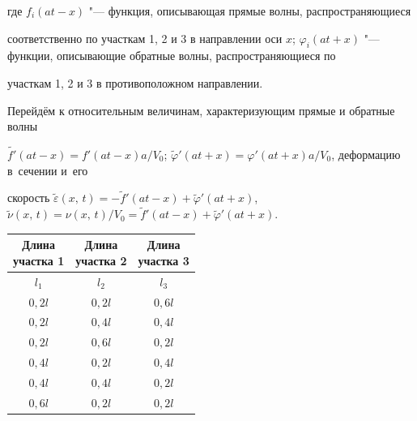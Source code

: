 где $f_i (at-x)$ "--- функция, описывающая прямые волны, распространяющиеся

соответственно по участкам 1, 2 и 3 в направлении оси $x$; $\varphi_i

(at+x)$ "--- функции, описывающие обратные волны, распространяющиеся по

участкам 1, 2 и 3 в противоположном направлении.



Перейдём к относительным величинам, характеризующим прямые и обратные волны

$\tilde {f'}(at-x)={f'(at-x)a}/{V_0}$; $\tilde {\varphi }'(at+x)={\varphi'(at+x) a}/{V_0}$, деформацию в~сечении и~его

скорость $\tilde {\varepsilon }(x,\,t)=-\tilde {f}'(at-x)+

\tilde {\varphi}'(at+x)$, $\tilde {\nu}(x,\,t)={\nu (x,\,t)}/{V_0}=\tilde {f}'(at-x)+\tilde {\varphi }'(at+x)$.



\begin{table} \centering \small \vspace{-3mm}

\begin{tabular}{c|c|c}

\hline

\cbox{Длина \\ участка 1 }&

\cbox{Длина \\ участка 2 }&

\cbox{Длина \\ участка 3 } \\ \hline

$l_1$ & $l_2$ & $l_3$ \\ %

$0,2l$& $0,2l$& $0,6l$ \\ %

$0,2l$& $0,4l$& $0,4l$ \\ %

$0,2l$& $0,6l$& $0,2l$ \\ %

$0,4l$& $0,2l$& $0,4l$ \\ %

$0,4l$& $0,4l$& $0,2l$ \\ %

$0,6l$& $0,2l$& $0,2l$ \\ \hline

\end{tabular}

\end{table}



